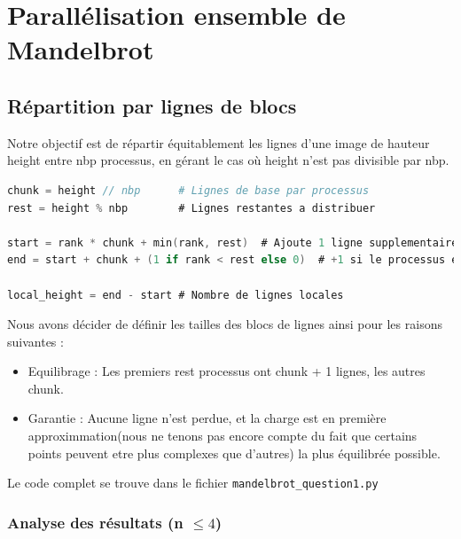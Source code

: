 \documentclass[a4paper,13pt]{book}
\begin{document}
\clearpage
\section{Parallélisation ensemble de Mandelbrot}
\subsection{Répartition par lignes de blocs}
Notre objectif est de répartir équitablement les lignes d’une image de hauteur height entre nbp processus, en gérant le cas où height n’est pas divisible par nbp. 

\begin{lstlisting}[language=C, caption={Bloc du fichier mandelbrot\_question1.py montrant comment la taille des blocs de lignes répartis}]
chunk = height // nbp      # Lignes de base par processus
rest = height % nbp        # Lignes restantes a distribuer

start = rank * chunk + min(rank, rest)  # Ajoute 1 ligne supplementaire pour les premiers rest processus
end = start + chunk + (1 if rank < rest else 0)  # +1 si le processus est dans les `rest` premiers

local_height = end - start # Nombre de lignes locales
\end{lstlisting}
Nous avons décider de définir les tailles des blocs de lignes ainsi pour les raisons suivantes : 
\begin{itemize}
  \item Equilibrage : Les premiers rest processus ont chunk + 1 lignes, les autres chunk.

  \item Garantie : Aucune ligne n’est perdue, et la charge est en première approximmation(nous ne tenons pas encore compte du fait que certains points peuvent etre plus complexes que d'autres) la plus équilibrée possible.
\end{itemize}
Le code complet se trouve dans le fichier \texttt{mandelbrot\_question1.py}
\subsubsection{Analyse des résultats (n $\leq 4$)}
\end{document}

